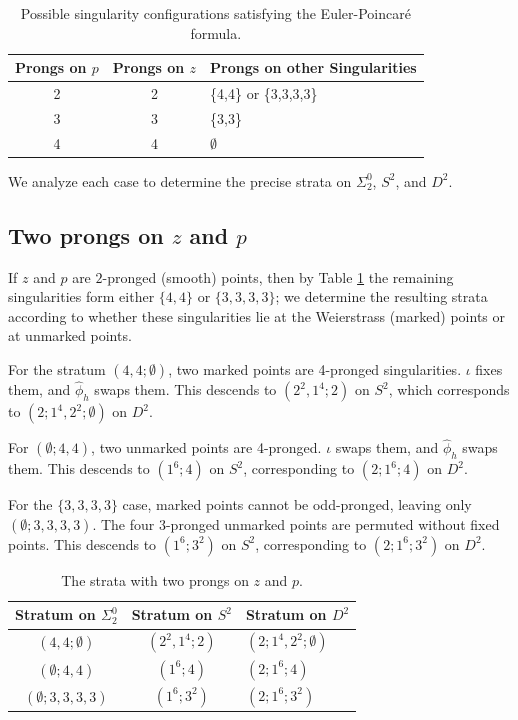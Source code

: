 \begin{table}[ht]
    \centering
    \begin{tabular}{c c l}
        \toprule
        Prongs on $p$ & Prongs on $z$ & Prongs on other Singularities \\
        \midrule
        2 & 2 & \{4,4\} or \{3,3,3,3\}\\
        3 & 3 & \{3,3\} \\
        4 & 4 & $\emptyset$ \\
        \bottomrule
    \end{tabular}
    \caption{Possible singularity configurations satisfying the Euler-Poincar\'{e} formula.}
    \label{tab:prong_configurations}
\end{table}

We analyze each case to determine the precise strata on $\Sigma_2^0$, $S^2$, and $D^2$.

\subsection{Two prongs on $z$ and $p$}
If $z$ and $p$ are $2$-pronged (smooth) points, then by Table \ref{tab:prong_configurations} the remaining singularities form either $\{4,4\}$ or $\{3,3,3,3\}$; we determine the resulting strata according to whether these singularities lie at the Weierstrass (marked) points or at unmarked points.

For the stratum $(4,4;\emptyset)$, two marked points are 4-pronged singularities. $\iota$ fixes them, and $\hat{\phi}_h$ swaps them. This descends to $(2^2,1^4;2)$ on $S^2$, which corresponds to $(2;1^4,2^2; \emptyset)$ on $D^2$.

For $(\emptyset; 4,4)$, two unmarked points are 4-pronged. $\iota$ swaps them, and $\hat{\phi}_h$ swaps them. This descends to $(1^6;4)$ on $S^2$, corresponding to $(2;1^6;4)$ on $D^2$.

For the $\{3,3,3,3\}$ case, marked points cannot be odd-pronged, leaving only $(\emptyset; 3,3,3,3)$. The four 3-pronged unmarked points are permuted without fixed points. This descends to $(1^6;3^2)$ on $S^2$, corresponding to $(2;1^6;3^2)$ on $D^2$.

\begin{table}[ht]
    \centering
    \begin{tabular}{c c l}
        \toprule
        Stratum on $\Sigma_2^0$ & Stratum on $S^2$ & Stratum on $D^2$ \\
        \midrule
        $(4,4;\emptyset)$ & $(2^2,1^4;2)$ & $(2;1^4,2^2;\emptyset)$ \\
        $(\emptyset;4,4)$ & $(1^6;4)$ & $(2;1^6;4)$ \\
        $(\emptyset; 3,3,3,3)$ & $(1^6;3^2)$ & $(2;1^6;3^2)$\\
        \bottomrule
    \end{tabular}
    \caption{The strata with two prongs on $z$ and $p$.}
    \label{tab:strata_2_prongs}
\end{table}

